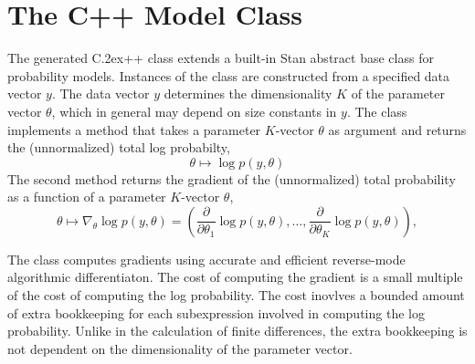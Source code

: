 \documentclass[10pt]{report}
\newcommand{\Stan}{Stan\xspace}
\newcommand*{\Cpp}{C\raise.2ex\hbox{\footnotesize ++}\xspace} %
\begin{document}



\chapter{The C++ Model Class}

The generated \Cpp class extends a built-in \Stan abstract
base class for probability models.  Instances of the class are
constructed from a specified data vector $y$.  The data vector $y$
determines the dimensionality $K$ of the parameter vector $\theta$,
which in general may depend on size constants in $y$.  The class
implements a method that takes a parameter $K$-vector $\theta$ as
argument and returns the (unnormalized) total log probabilty,
\[
\theta 
\mapsto 
\log p(y,\theta) 
\]
The second method returns the gradient of the (unnormalized) total
probability as a function of a parameter $K$-vector $\theta$,
\[
\theta
\mapsto
\nabla_{\theta} \log p(y,\theta)
= ( \frac{\partial}{\partial\theta_1} \log p(y,\theta),
  \ldots, 
  \frac{\partial}{\partial\theta_K} \log p(y,\theta) ),
\]

The class computes gradients using accurate and efficient reverse-mode
algorithmic differentiaton.  The cost of computing the gradient is
a small multiple of the cost of computing the log probability.  The
cost inovlves a bounded amount of extra bookkeeping for each 
subexpression involved in computing the log probability.  Unlike
in the calculation of finite differences, the extra bookkeeping is
not dependent on the dimensionality of the parameter vector.
\end{document}
